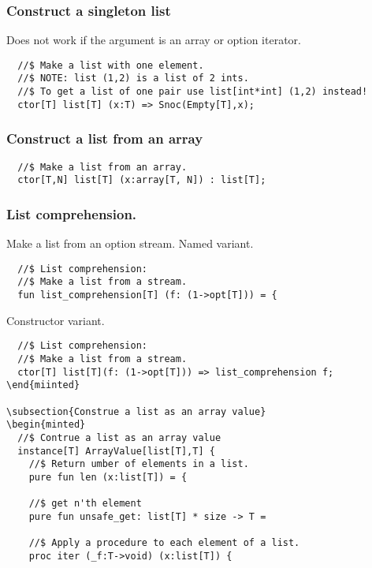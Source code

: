\documentclass[oneside]{book}
\begin{document}
{\subsubsection{Construct a singleton list}
Does not work if the argument is an array
or option iterator.

\begin{verbatim}
  //$ Make a list with one element.
  //$ NOTE: list (1,2) is a list of 2 ints.
  //$ To get a list of one pair use list[int*int] (1,2) instead!
  ctor[T] list[T] (x:T) => Snoc(Empty[T],x);
\end{verbatim}

\subsubsection{Construct a list from an array}
\begin{verbatim}
  //$ Make a list from an array.
  ctor[T,N] list[T] (x:array[T, N]) : list[T];
\end{verbatim}

\subsubsection{List comprehension.}
Make a list from an option stream.
Named variant.

\begin{verbatim}
  //$ List comprehension:
  //$ Make a list from a stream.
  fun list_comprehension[T] (f: (1->opt[T])) = {
\end{verbatim}

Constructor variant.

\begin{verbatim}
  //$ List comprehension:
  //$ Make a list from a stream.
  ctor[T] list[T](f: (1->opt[T])) => list_comprehension f;
\end{miinted}

\subsection{Construe a list as an array value}
\begin{minted}
  //$ Contrue a list as an array value
  instance[T] ArrayValue[list[T],T] {
    //$ Return umber of elements in a list.
    pure fun len (x:list[T]) = {

    //$ get n'th element
    pure fun unsafe_get: list[T] * size -> T =

    //$ Apply a procedure to each element of a list.
    proc iter (_f:T->void) (x:list[T]) {


\end{verbatim}}
\end{document}
